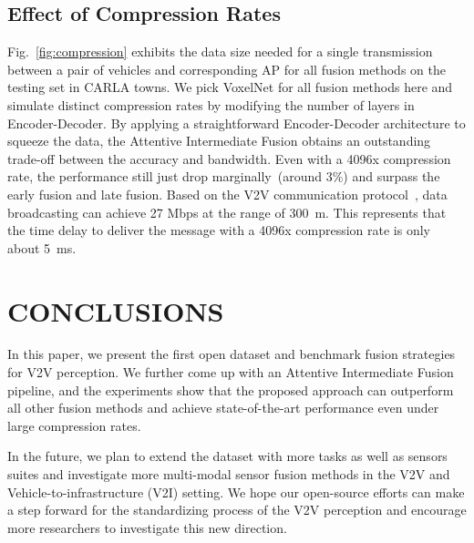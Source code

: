 \subsection{Effect of Compression Rates}
Fig.~\ref{fig:compression} exhibits the data size needed for a single transmission between a pair of vehicles and corresponding AP for all fusion methods on the testing set in CARLA towns. We pick VoxelNet for all fusion methods here and simulate distinct compression rates by modifying the number of layers in Encoder-Decoder. By applying a straightforward Encoder-Decoder architecture to squeeze the data, the Attentive Intermediate Fusion obtains an outstanding trade-off between the accuracy and bandwidth. Even with a 4096x compression rate, the performance still just drop marginally~(around 3\%) and surpass the early fusion and late fusion. Based on the V2V communication protocol~\cite{arena2019overview}, data broadcasting can achieve 27 Mbps at the range of 300~m. This represents that the time delay to deliver the message with a 4096x compression rate is only about 5~ms. 

        
        

\section{CONCLUSIONS}
In this paper, we present the first open dataset and benchmark fusion strategies for V2V perception. We further come up with an Attentive Intermediate Fusion pipeline, and the experiments show that the proposed approach can outperform all other fusion methods and achieve state-of-the-art performance even under large compression rates. 

In the future, we plan to extend the dataset with more tasks as well as sensors suites and investigate more multi-modal sensor fusion methods in the V2V and Vehicle-to-infrastructure (V2I) setting. We hope our open-source efforts can make a step forward for the standardizing process of the V2V perception and encourage more researchers to investigate this new direction. 

\addtolength{\textheight}{-3cm}   %

